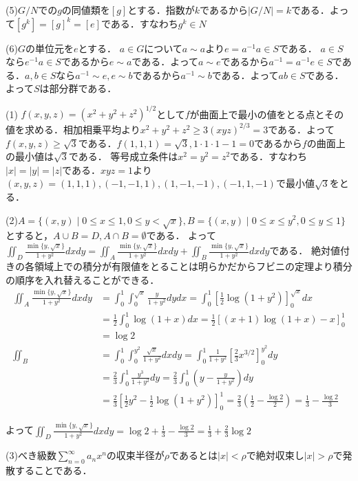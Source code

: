 \documentclass[
		book,
		head_space=20mm,
		foot_space=20mm,
		gutter=10mm,
		line_length=190mm
]{jlreq}
\begin{document}
(5)$G/N$での$g$の同値類を$[g]$とする．指数が$k$であるから$|G/N|=k$である．よって$[g^k]=[g]^k=[e]$である．すなわち$g^k \in N$

(6)$G$の単位元を$e$とする．
$a\in G$について$a \sim a$より$e=a^{-1}a \in S$である．
$a\in S$なら$e^{-1}a \in S$であるから$e\sim a$である．よって$a \sim e$であるから$a^{-1}=a^{-1}e \in S$である．$a,b \in S$なら$a^{-1} \sim e,e \sim b$であるから$a^{-1} \sim b$である．よって$ab \in S$である．よって$S$は部分群である．

(1)
$f(x,y,z)=(x^2+y^2+z^2)^{1/2}$として$f$が曲面上で最小の値をとる点とその値を求める．相加相乗平均より$x^2+y^2+z^2 \ge 3(xyz)^{2/3}=3$である．よって$f(x,y,z) \ge \sqrt{3}$である．$f(1,1,1)=\sqrt{3},1\cdot1\cdot1-1=0$であるから$f$の曲面上の最小値は$\sqrt{3}$である．
等号成立条件は$x^2=y^2=z^2$である．すなわち$|x|=|y|=|z|$である．$xyz=1$より$(x,y,z)=(1,1,1),(-1,-1,1),(1,-1,-1),(-1,1,-1)$で最小値$\sqrt{3}$をとる．

(2)$A=\{ (x,y) \mid 0\le x \le 1,0\le y< \sqrt{x}\},B=\{ (x,y)\mid 0\le x \le y^2,0\le y\le 1\}$とすると，$A \cup B= D,A\cap B=\emptyset$である．
よって$\iint_D \frac{\min\{y,\sqrt{x}\}}{1+y^2}dxdy=\iint_A \frac{\min\{y,\sqrt{x}\}}{1+y^2}dxdy+\iint_B \frac{\min\{y,\sqrt{x}\}}{1+y^2}dxdy$である．
絶対値付きの各領域上での積分が有限値をとることは明らかだからフビニの定理より積分の順序を入れ替えることができる．
\begin{align}
    \iint_A \frac{\min\{y,\sqrt{x}\}}{1+y^2}dxdy&=\int_0^1 \int_0^{\sqrt{x}} \frac{y}{1+y^2}dydx=\int_0^1 \left[ \frac{1}{2}\log(1+y^2) \right]_0^{\sqrt{x}}dx\\
    &=\frac{1}{2}\int_0^1 \log(1+x)dx=\frac{1}{2}\left[ (x+1)\log(1+x)-x \right]_0^1\\
    &=\log 2 \\
    \iint_B &= \int_0^1 \int_0^{y^2} \frac{\sqrt{x}}{1+y^2}dxdy=\int_0^1\frac{1}{1+y^2} \left[ \frac{2}{3}x^{3/2} \right]_0^{y^2}dy\\
    &=\frac{2}{3}\int_0^1 \frac{y^3}{1+y^2}dy=\frac{2}{3}\int_0^1 \left( y-\frac{y}{1+y^2} \right)dy\\
    &=\frac{2}{3}\left[ \frac{1}{2}y^2-\frac{1}{2}\log(1+y^2) \right]_0^1=\frac{2}{3}(\frac{1}{2}-\frac{\log 2}{2})=\frac{1}{3}-\frac{\log 2}{3}
\end{align}

よって$\iint_D \frac{\min\{y,\sqrt{x}\}}{1+y^2}dxdy=\log 2+\frac{1}{3}-\frac{\log 2}{3}=\frac{1}{3}+\frac{2}{3}\log 2$

(3)べき級数$\sum_{n=0}^{\infty} a_nx^n$の収束半径が$\rho$であるとは$|x| < \rho$で絶対収束し$|x| > \rho$で発散することである．
\end{document}
